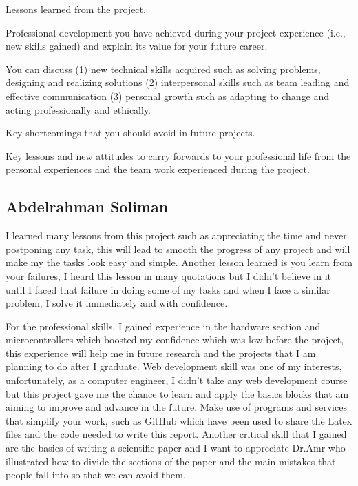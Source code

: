 \documentclass[../main.tex]{subfiles}
\begin{document}
\begin{newrequirements}
    \begin{todolist}
    \item Lessons learned from the project. 

    \item Professional development you have 
        achieved during your project 
        experience (i.e., new skills gained) 
        and explain its value for your future 
        career. 

    \item You can discuss (1) new technical 
        skills acquired such as solving 
        problems, designing and realizing 
        solutions (2) interpersonal skills such 
        as team leading and effective 
        communication (3) personal growth such 
        as adapting to change and acting 
        professionally and ethically. 

    \item Key shortcomings that you should avoid 
        in future projects. 

    \item Key lessons and new attitudes to carry 
        forwards to your professional life from 
        the personal experiences and the team 
        work experienced during the project. 
                
    \end{todolist}
\end{newrequirements}

\subsection{Abdelrahman Soliman}

I learned many lessons from this project such as appreciating 
the time and never postponing any task, this will lead to smooth 
the progress of any project and will make my the tasks look 
easy and simple. Another lesson learned is you learn from 
your failures, I heard this lesson in many quotations but I 
didn't believe in it until I faced that failure in doing some of 
my tasks and when I face a similar problem, I solve it 
immediately and with confidence.

For the professional skills, I gained experience in the hardware 
section and microcontrollers which boosted my confidence which 
was low before the project, this experience will help me in 
future research and the projects that I am planning to do after 
I graduate. 
Web development skill was one of my interests, 
unfortunately, as a computer engineer, I didn't take any web 
development course but this project gave me the chance to learn 
and apply the basics blocks that am aiming to improve 
and advance in the future. 
Make use of programs and services that simplify
your work, such as GitHub which have been used to share the 
Latex files and the code needed to write this report.
Another critical skill that I gained 
are the basics of writing a scientific paper and I want to 
appreciate Dr.Amr who illustrated how to divide the sections of 
the paper and the main mistakes that people fall into so that 
we can avoid them.
\end{document}
